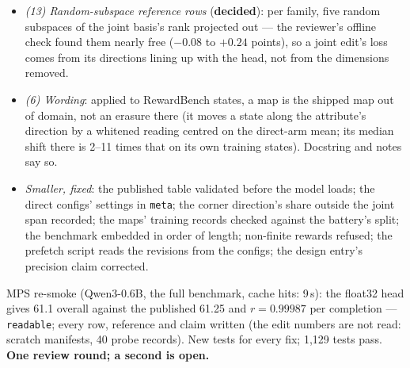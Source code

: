 \documentclass{article}
\begin{document}
\begin{itemize}
        for 8{,}977 completions and inflated ties at the top (8 vs the fp16 leaderboard's 2).
  \item \emph{(13) Random-subspace reference rows} (\textbf{decided}): per family, five random subspaces of the joint
        basis's rank projected out --- the reviewer's offline check found them nearly free ($-0.08$ to $+0.24$ points),
        so a joint edit's loss comes from its directions lining up with the head, not from the dimensions removed.
  \item \emph{(6) Wording}: applied to RewardBench states, a \leace{} map is the shipped map out of domain, not an
        erasure there (it moves a state along the attribute's direction by a whitened reading centred on the direct-arm
        mean; its median shift there is 2--11 times that on its own training states). Docstring and notes say so.
  \item \emph{Smaller, fixed}: the published table validated before the model loads; the direct configs' settings in
        \texttt{meta}; the corner direction's share outside the joint span recorded; the \leace{} maps' training records
        checked against the battery's split; the benchmark embedded in order of length; non-finite rewards refused; the
        prefetch script reads the revisions from the configs; the design entry's precision claim corrected.
\end{itemize}
MPS re-smoke (Qwen3-0.6B, the full benchmark, cache hits: 9\,s): the float32 head gives 61.1 overall against the
published 61.25 and $r = 0.99987$ per completion --- \texttt{readable}; every row, reference and claim written (the edit
numbers are not read: scratch manifests, 40 probe records). New tests for every fix; 1{,}129 tests pass. \textbf{One
review round; a second is open.}



\end{document}
